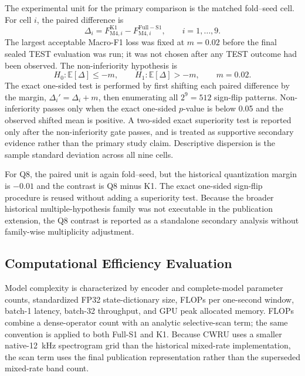 The experimental unit for the primary comparison is the matched fold--seed cell. For cell $i$, the paired difference is
\begin{equation}
  \Delta_i = F_{\mathrm{M4},i}^{\mathrm{K1}} - F_{\mathrm{M4},i}^{\mathrm{Full-S1}},
  \qquad i=1,\ldots,9.
\end{equation}
The largest acceptable Macro-F1 loss was fixed at $m=0.02$ before the final sealed TEST evaluation was run; it was not chosen after any TEST outcome had been observed. The non-inferiority hypothesis is
\begin{equation}
  H_0:\mathbb{E}[\Delta]\leq -m, \qquad
  H_1:\mathbb{E}[\Delta]>-m, \qquad m=0.02.
\end{equation}
The exact one-sided test is performed by first shifting each paired difference by the margin, $\Delta_i'=\Delta_i+m$, then enumerating all $2^9=512$ sign-flip patterns. Non-inferiority passes only when the exact one-sided $p$-value is below 0.05 and the observed shifted mean is positive. A two-sided exact superiority test is reported only after the non-inferiority gate passes, and is treated as supportive secondary evidence rather than the primary study claim. Descriptive dispersion is the sample standard deviation across all nine cells.

For Q8, the paired unit is again fold--seed, but the historical quantization margin is $-0.01$ and the contrast is Q8 minus K1. The exact one-sided sign-flip procedure is reused without adding a superiority test. Because the broader historical multiple-hypothesis family was not executable in the publication extension, the Q8 contrast is reported as a standalone secondary analysis without family-wise multiplicity adjustment.

\subsection{Computational Efficiency Evaluation}
\label{subsec:efficiency_method}

Model complexity is characterized by encoder and complete-model parameter counts, standardized FP32 state-dictionary size, FLOPs per one-second window, batch-1 latency, batch-32 throughput, and GPU peak allocated memory. FLOPs combine a dense-operator count with an analytic selective-scan term; the same convention is applied to both Full-S1 and K1. Because CWRU uses a smaller native-12~kHz spectrogram grid than the historical mixed-rate implementation, the scan term uses the final publication representation rather than the superseded mixed-rate band count.


